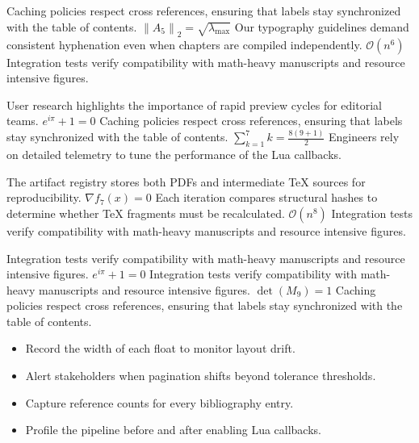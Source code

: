 \documentclass[12pt,a4paper,twocolumn]{article}
\newcommand{\paraid}[1]{\par\noindent\hypertarget{#1}{\ignorespaces}}
\begin{document}
\paraid{sec1-p4}Caching policies respect cross references, ensuring that labels stay synchronized with the table of contents. $\left\|A_{5}\right\|_{2} = \sqrt{\lambda_{\max}}$ Our typography guidelines demand consistent hyphenation even when chapters are compiled independently. $\mathcal{O}(n^{6})$ Integration tests verify compatibility with math-heavy manuscripts and resource intensive figures.
\par

\paraid{sec1-p5}User research highlights the importance of rapid preview cycles for editorial teams. $e^{i\pi} + 1 = 0$ Caching policies respect cross references, ensuring that labels stay synchronized with the table of contents. $\sum_{k=1}^{7} k = \frac{8(9+1)}{2}$ Engineers rely on detailed telemetry to tune the performance of the Lua callbacks.
\par

\paraid{sec1-p6}The artifact registry stores both PDFs and intermediate TeX sources for reproducibility. $\nabla f_{7}(x) = 0$ Each iteration compares structural hashes to determine whether TeX fragments must be recalculated. $\mathcal{O}(n^{8})$ Integration tests verify compatibility with math-heavy manuscripts and resource intensive figures.
\par

\paraid{sec1-p7}Integration tests verify compatibility with math-heavy manuscripts and resource intensive figures. $e^{i\pi} + 1 = 0$ Integration tests verify compatibility with math-heavy manuscripts and resource intensive figures. $\det(M_{9}) = 1$ Caching policies respect cross references, ensuring that labels stay synchronized with the table of contents.
\par

\begin{itemize}

\item 
        Record the width of each float to monitor layout drift.
      

\item 
        Alert stakeholders when pagination shifts beyond tolerance thresholds.
      

\item 
        Capture reference counts for every bibliography entry.
      

\item 
        Profile the pipeline before and after enabling Lua callbacks.
      

\end{itemize}
\end{document}
